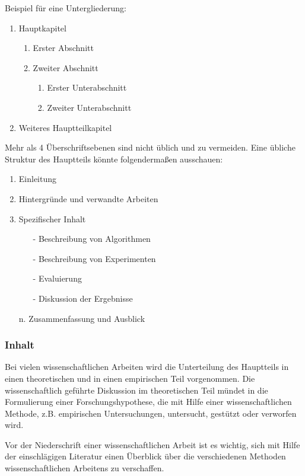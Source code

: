 Beispiel für eine Untergliederung:
%
\begin{enumerate}[label=\arabic*]
  \item Hauptkapitel
  \begin{enumerate}[label=\arabic{enumi}.\arabic*]
    \item Erster Abschnitt
    \item Zweiter Abschnitt
    \begin{enumerate}[label=\arabic{enumi}.\arabic{enumii}.\arabic*]
       \item Erster Unterabschnitt
       \item Zweiter Unterabschnitt
    \end{enumerate}
  \end{enumerate}
  \item Weiteres Hauptteilkapitel
\end{enumerate}
\bigskip

Mehr als 4 Überschriftsebenen sind nicht üblich und zu vermeiden. Eine übliche Struktur des Hauptteils könnte folgendermaßen ausschauen:
\begin{enumerate}
  \item Einleitung
  \item Hintergründe und verwandte Arbeiten
  \item Spezifischer Inhalt
  \begin{itemize}
    \item[-] Beschreibung von Algorithmen
    \item[-] Beschreibung von Experimenten
    \item[-] Evaluierung
    \item[-] Diskussion der Ergebnisse
  \end{itemize}
  \item[n.] Zusammenfassung und Ausblick
\end{enumerate}

\subsubsection{Inhalt}\label{sec:structure:main:content}
%
Bei vielen wissenschaftlichen Arbeiten wird die Unterteilung des Hauptteils in einen theoretischen und in einen empirischen Teil vorgenommen. Die wissenschaftlich geführte Diskussion im theoretischen Teil mündet in die Formulierung einer Forschungshypothese, die mit Hilfe einer wissenschaftlichen Methode, z.B. empirischen Untersuchungen, untersucht, gestützt oder verworfen wird.

Vor der Niederschrift einer wissenschaftlichen Arbeit ist es wichtig, sich mit Hilfe der einschlägigen Literatur einen Überblick über die verschiedenen Methoden wissenschaftlichen Arbeitens zu verschaffen.

